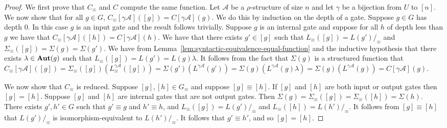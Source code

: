 \documentclass[../paper.tex]{subfiles}
\begin{document}
\begin{proof}
  We first prove that $C_\equiv$ and $C$ compute the same function. Let
  $\mathcal{A}$ be a $\rho$-structure of size $n$ and let $\gamma$ be a
  bijection from $U$ to $[n]$. We now show that for all $g \in G$, $C_\equiv
  [\gamma \mathcal{A}]([g]) = C[\gamma \mathcal{A}](g)$. We do this by induction
  on the depth of a gate. Suppose $g \in G$ has depth $0$. In this case $g$ is
  an input gate and the result follows trivially. Suppose $g$ is an internal
  gate and suppose for all $h$ of depth less than $g$ we have that
  $C_\equiv[\gamma \mathcal{A}]([h]) = C[\gamma \mathcal{A}](h)$. We have that
  there exists $g' \in [g]$ such that $L_\equiv ([g]) = L(g') /_\equiv$ and
  $\Sigma_\equiv([g]) = \Sigma (g) = \Sigma (g')$. We have from
  Lemma~\ref{lem:syntactic-equivalence-equal-function} and the inductive
  hypothesis that there exists $\lambda \in \text{\textbf{Aut}}(g)$ such that $L_\equiv ([g]) =
  L(g') = L(g) \lambda$. It follows from the fact that $\Sigma(g)$ is a
  structured function that $C_\equiv[\gamma \mathcal{A}]([g]) = \Sigma_\equiv
  ([g])(L^{\gamma \mathcal{A}}_\equiv([g])) = \Sigma (g') (L^{\gamma
    \mathcal{A}}(g')) = \Sigma (g)(L^{\gamma \mathcal{A}}(g) \lambda) = \Sigma
  (g) (L^{\gamma \mathcal{A}}(g)) = C[\gamma \mathcal{A}](g)$.
  
  We now show that $C_\equiv$ is reduced. Suppose $[g], [h] \in G_\equiv$ and
  suppose $[g] \equiv [h]$. If $[g]$ and $[h]$ are both input or output gates
  then $[g] = [h]$. Suppose $[g]$ and $[h]$ are internal gates that are not
  output gates. Then $\Sigma (g) = \Sigma_\equiv ([g]) = \Sigma_\equiv([h]) =
  \Sigma(h)$. There exists $g', h' \in G$ such that $g' \equiv g$ and $h' \equiv
  h$, and $L_\equiv ([g]) = L(g') /_\equiv$ and $L_\equiv ([h]) = L(h')
  /_\equiv$. It follows from $[g] \equiv [h]$ that $L(g') /_\equiv$ is
  isomorphism-equivalent to $L(h') /_\equiv$. It follows that $g' \equiv h'$,
  and so $[g] = [h]$.


\end{proof}
\end{document}
